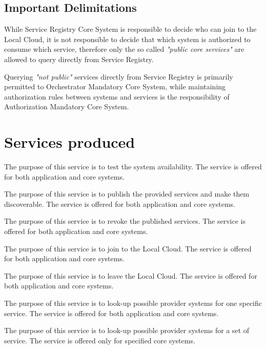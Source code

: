 \documentclass[a4paper]{arrowhead}
\begin{document}
\subsection{Important Delimitations}
\label{sec:delimitations}

While Service Registry Core System is responsible to decide who can join to the Local Cloud, it is not responsible to decide that which system is authorized to consume which service, therefore only the so called \textit{"public core services"} are allowed to query directly from Service Registry.

Querying \textit{"not public"} services directly from Service Registry is primarily permitted to Orchestrator Mandatory Core System, while maintaining authorization rules between systems and services is the responsibility of Authorization Mandatory Core System.

\newpage

\section{Services produced}
\label{sec:services}

The purpose of this service is to test the system availability. The service is offered for both application and core systems. 

The purpose of this service is to publish the provided services and make them discoverable. The service is offered for both application and core systems. 

The purpose of this service is to revoke the published services. The service is offered for both application and core systems. 

The purpose of this service is to join to the Local Cloud. The service is offered for both application and core systems.

The purpose of this service is to leave the Local Cloud. The service is offered for both application and core systems.

The purpose of this service is to look-up possible provider systems for one specific service. The service is offered for both application and core systems.

The purpose of this service is to look-up possible provider systems for a set of service. The service is offered only for specified core systems.
\end{document}
